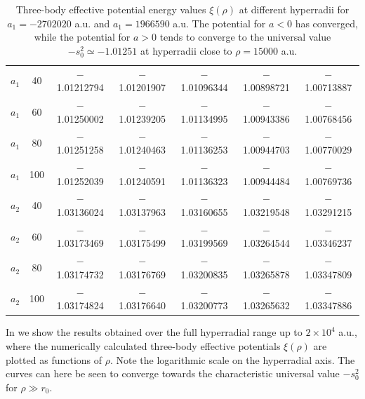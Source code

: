 \begin{table}[h!]
\begin{adjustwidth}{-0.1cm}{}
\begin{tabular}{||c c c c c c c||}
			\hline\hline  \Tstrut\Bstrut 
			$a_1$   & 40  & $-$1.01212794 & $-$1.01201907 & $-$1.01096344 & $-$1.00898721& $-$1.00713887 \\
			$a_1$   & 60  & $-$1.01250002& $-$1.01239205 & $-$1.01134995 & $-$1.00943386 & $-$1.00768456 \\
			$a_1$   & 80 & $-$1.01251258 & $-$1.01240463 & $-$1.01136253 & $-$1.00944703 & $-$1.00770029 \\
			$a_1$   & 100  & $-$1.01252039 & $-$1.01240591 & $-$1.01136323 & $-$1.00944484& $-$1.00769736 \\[0.5ex]
			\hline  \Tstrut\Bstrut 
			$a_2$   & 40 & $-$1.03136024 & $-$1.03137963 & $-$1.03160655 & $-$1.03219548 & $-$1.03291215 \\
			$a_2$   & 60 & $-$1.03173469 & $-$1.03175499 & $-$1.03199569 & $-$1.03264544 & $-$1.03346237 \\
			$a_2$   & 80  & $-$1.03174732 & $-$1.03176769 & $-$1.03200835 & $-$1.03265878 & $-$1.03347809 \\
			$a_2$   & 100 & $-$1.03174824 & $-$1.03176640 & $-$1.03200773 & $-$1.03265632 & $-$1.03347886 \\ [0.7ex] 
			\hline
		\end{tabular}
	\end{adjustwidth}
	\caption{Three-body effective potential energy values $\xi(\rho)$ at different hyperradii for $a_1 = -2702020$ a.u. and $a_1 = 1966590$ a.u. The potential for $a<0$ has converged, while the potential for $a>0$ tends to converge to the universal value $-s_0^2 \simeq -1.01251$ at hyperradii close to $\rho=15000$ a.u.}
	\label{table:Res_2}
\end{table} 

In  we show the results obtained over the full hyperradial range up to $2 \times 10^4$ a.u., where the numerically calculated three-body effective potentials $\xi(\rho)$ are plotted as functions of $\rho$. Note the logarithmic scale on the hyperradial axis. The curves can here be seen to converge towards the characteristic universal value $-s_0^2$ for $\rho \gg r_0$. 

